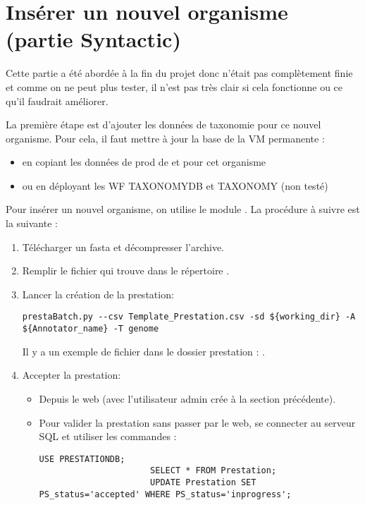 \section{Insérer un nouvel organisme (partie Syntactic)} \label{sec:syntactic}

\begin{warningbox}
    Cette partie a été abordée à la fin du projet donc n'était pas complètement finie
    et comme on ne peut plus tester, il n'est pas très clair si cela fonctionne
    ou ce qu'il faudrait améliorer.
\end{warningbox}

La première étape est d'ajouter les données de taxonomie pour ce nouvel organisme.
Pour cela, il faut mettre à jour la base  de la VM permanente :
\begin{itemize}
    \item en copiant les données de prod de  et  pour cet organisme
    \item ou en déployant les WF TAXONOMYDB et TAXONOMY (non testé)
\end{itemize}

Pour insérer un nouvel organisme, on utilise le module .
La procédure à suivre est la suivante :
\begin{enumerate}
    \item Télécharger un fasta et décompresser l'archive.
    \item Remplir le fichier  qui trouve dans le répertoire .
    \item Lancer la création de la prestation:
          \begin{lstlisting}[style=bash,gobble=14]
              prestaBatch.py --csv Template_Prestation.csv -sd ${working_dir} -A ${Annotator_name} -T genome
          \end{lstlisting}
          Il y a un exemple de fichier  dans le dossier prestation : .
    \item Accepter la prestation:
          \begin{itemize}
              \item Depuis le web (avec l'utilisateur admin crée à la section précédente).
              \item Pour valider la prestation sans passer par le web, se connecter au serveur SQL et utiliser les commandes :
                    \begin{lstlisting}[style=SQL,gobble=22]
                      USE PRESTATIONDB;
                      SELECT * FROM Prestation;
                      UPDATE Prestation SET PS_status='accepted' WHERE PS_status='inprogress';
                  \end{lstlisting}
           \end{itemize}
\end{enumerate}

